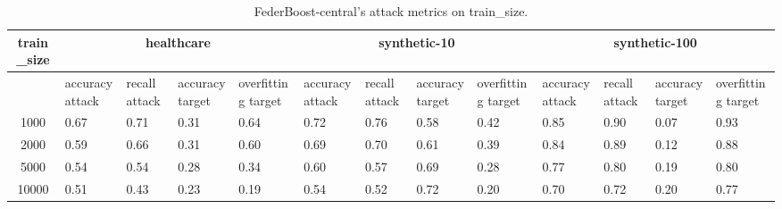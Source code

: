 \begin{table*}[]\centering
\begin{tabular}{|c| *{12}{m{1.0cm}|}}
\hline\rowcolor{gray!50}
\cellcolor{gray!80} train_size & \multicolumn{4}{c|}{healthcare} & \multicolumn{4}{c|}{synthetic-10} & \multicolumn{4}{c|}{synthetic-100}\\\hline 
& accuracy attack & recall attack & accuracy target & overfitting target & accuracy attack & recall attack & accuracy target & overfitting target & accuracy attack & recall attack & accuracy target & overfitting target\\\hline
1000 & 0.67 & 0.71 & 0.31 & 0.64 & 0.72 & 0.76 & 0.58 & 0.42 & 0.85 & 0.90 & 0.07 & 0.93\\ \hline
2000 & 0.59 & 0.66 & 0.31 & 0.60 & 0.69 & 0.70 & 0.61 & 0.39 & 0.84 & 0.89 & 0.12 & 0.88\\ \hline
5000 & 0.54 & 0.54 & 0.28 & 0.34 & 0.60 & 0.57 & 0.69 & 0.28 & 0.77 & 0.80 & 0.19 & 0.80\\ \hline
10000 & 0.51 & 0.43 & 0.23 & 0.19 & 0.54 & 0.52 & 0.72 & 0.20 & 0.70 & 0.72 & 0.20 & 0.77\\ \hline
\end{tabular} 
\caption{FederBoost-central's attack metrics on train_size.}
\label{tab:experiment1_train_size}
\end{table*}
